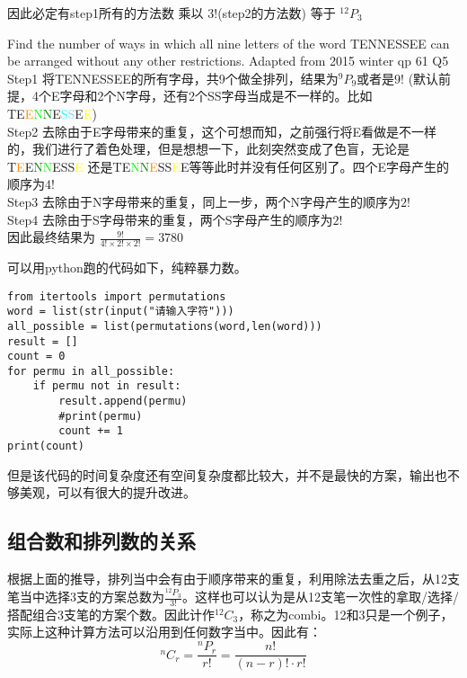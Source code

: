 因此必定有step1所有的方法数 乘以 3!(step2的方法数)  等于 $^{12}P_{3}$
\begin{ExampleBox}
Find the number of ways in which all nine letters of the word TENNESSEE can be arranged without any other restrictions.
\makebox{}\hfill Adapted from 2015 winter qp 61 Q5
\tcblower
Step1 将TENNESSEE的所有字母，共9个做全排列，结果为$^9P_9$或者是$9!$ (默认前提，4个E字母和2个N字母，还有2个SS字母当成是不一样的。比如T\textcolor{red!75}{E}\textcolor{DarkOrange}{E}\textcolor{lime}{N}\textcolor{green}{N}\textcolor{RedOrange}{E}\textcolor{cyan}{S}\textcolor{SkyBlue}{S}\textcolor{YellowOrange}{E}\textcolor{yellow}{E})\\
Step2 去除由于E字母带来的重复，这个可想而知，之前强行将E看做是不一样的，我们进行了着色处理，但是想想一下，此刻突然变成了色盲，无论是T\textcolor{DarkOrange}{E}\textcolor{RedOrange}{E}\textcolor{green}{N}\textcolor{lime}{N}\textcolor{YellowOrange}{E}SS\textcolor{yellow}{E} 还是T\textcolor{RedOrange}{E}\textcolor{lime}{N}\textcolor{green}{N}\textcolor{DarkOrange}{E}SS\textcolor{yellow}{E}\textcolor{YellowOrange}{E}等等此时并没有任何区别了。四个E字母产生的顺序为$4!$\\

Step3 去除由于N字母带来的重复，同上一步，两个N字母产生的顺序为$2!$\\

Step4 去除由于S字母带来的重复，两个S字母产生的顺序为$2!$\\

因此最终结果为 $\frac{9!}{4!\times 2!\times 2!}=3780$
\end{ExampleBox}

可以用python跑的代码如下，纯粹暴力数。
\begin{verbatim}
from itertools import permutations
word = list(str(input("请输入字符")))
all_possible = list(permutations(word,len(word)))
result = []
count = 0
for permu in all_possible:
	if permu not in result:
		result.append(permu)
		#print(permu)
		count += 1
print(count)
\end{verbatim}

但是该代码的时间复杂度还有空间复杂度都比较大，并不是最快的方案，输出也不够美观，可以有很大的提升改进。

\subsection*{组合数和排列数的关系}
根据上面的推导，排列当中会有由于顺序带来的重复，利用除法去重之后，从12支笔当中选择3支的方案总数为$\frac{^{12}P_{3}}{3!}$。这样也可以认为是从12支笔一次性的拿取/选择/搭配组合3支笔的方案个数。因此计作$^{12}C_{3}$，称之为\gls{combi}。12和3只是一个例子，实际上这种计算方法可以沿用到任何数字当中。因此有：
\[
	^{n}C_{r}  = \frac{^{n}P_{r}}{r!} = \frac{n!}{(n-r)!\cdot r!}
\]

